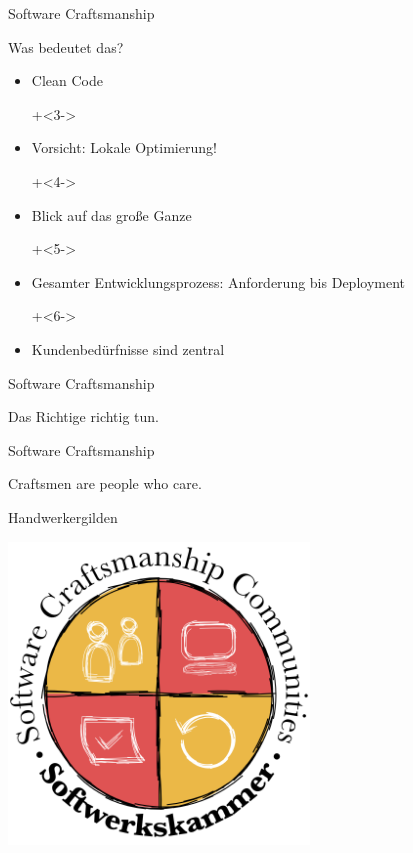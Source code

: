 \begin{frame}{Software Craftsmanship}

\Large{Was bedeutet das?}


\begin{itemize}
\onslide+<2->
	\item Clean Code
	
\onslide+<3->
	\item Vorsicht: Lokale Optimierung!
	
\onslide+<4->
	\item Blick auf das große Ganze
	
\onslide+<5->
	\item Gesamter Entwicklungsprozess: Anforderung bis Deployment
	
\onslide+<6->
	\item Kundenbedürfnisse sind zentral
	
\end{itemize}


\end{frame}


\begin{frame}{Software Craftsmanship}

\begin{center}
\Large
\glqq{}Das Richtige richtig tun.\grqq{}
\end{center}

\end{frame}

\begin{frame}{Software Craftsmanship}

\begin{center}
\Large
\glqq{}Craftsmen are people who care.\grqq{}
\end{center}

\end{frame}

\begin{frame}{Handwerkergilden}

\begin{center}
\includegraphics[width=8cm]{bilder/Softwerkskammer_WappenMitText.png}
\end{center}

\end{frame}

